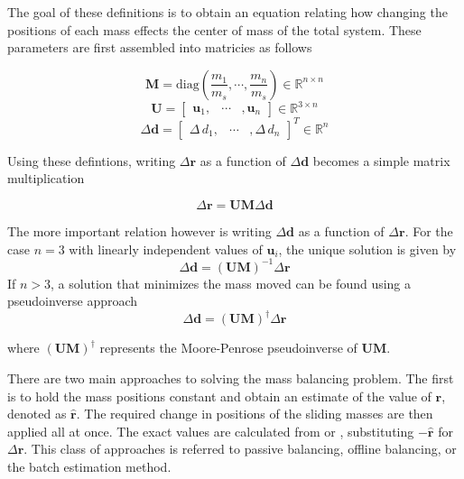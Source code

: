The goal of these definitions is to obtain an equation relating how changing the positions of each mass effects the center of mass of the total system. These parameters are first assembled into matricies as follows

\begin{equation}
    \bm{M}=\mathrm{diag}(\frac{m_1}{m_s}, \cdots  ,\frac{m_n}{m_s}) \in \mathbb{R}^{n \times n}
\end{equation}
\begin{equation}
    \bm{U}=
    \begin{bmatrix}
        \bm{u}_1, & \cdots & ,\bm{u}_n
    \end{bmatrix}
    \in \mathbb{R}^{3 \times n}
\end{equation}
\begin{equation}
    \Delta\bm{d}=
    \begin{bmatrix}
        \Delta\,d_1, & \cdots & ,\Delta\,d_n 
    \end{bmatrix}^T
    \in \mathbb{R}^{n}
\end{equation}

Using these defintions, writing $\Delta\bm{r}$ as a function of $\Delta\bm{d}$ becomes a simple matrix multiplication

\begin{equation}
    \Delta\bm{r} = \bm{U}\bm{M}\Delta\bm{d}
\end{equation}
 
The more important relation however is writing $\Delta\bm{d}$ as a function of $\Delta\bm{r}$. For the case $n = 3$ with linearly independent values of $\bm{u}_i$, the unique solution is given by
\begin{equation}\label{equation:delta_d_sol}
    \Delta\bm{d} = (\bm{U}\bm{M})^{-1}\Delta\bm{r}
\end{equation}
If $n>3$, a solution that minimizes the mass moved can be found using a pseudoinverse approach
\begin{equation}\label{equation:delta_d_pseudo_sol}
    \Delta\bm{d} = (\bm{U}\bm{M})^{\dagger }\Delta\bm{r}
\end{equation}

where $(\bm{U}\bm{M})^{\dagger}$ represents the Moore-Penrose pseudoinverse of $\bm{UM}$.

There are two main approaches to solving the mass balancing problem. The first is to hold the mass positions constant and obtain an estimate of the value of $\bm{r}$, denoted as $\hat{\bm{r}}$. The required change in positions of the sliding masses are then applied all at once. The exact values are calculated from  or , substituting $-\hat{\bm{r}}$ for $\Delta\bm{r}$. This class of approaches is referred to passive balancing, offline balancing, or the batch estimation method.

